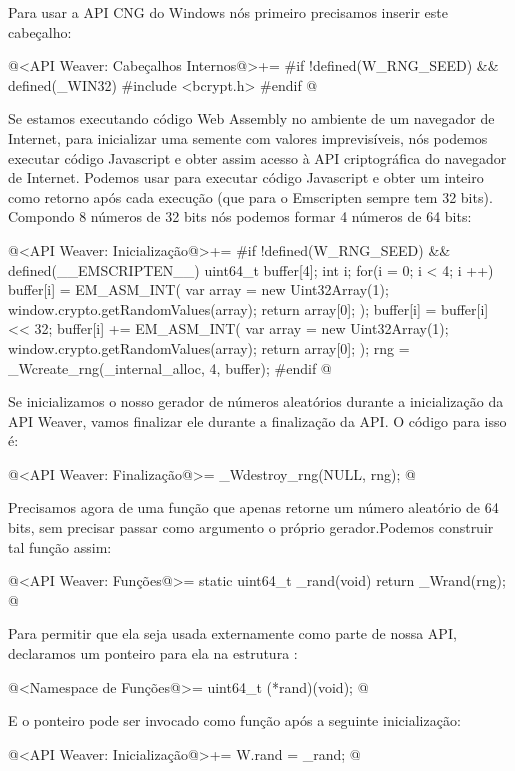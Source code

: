 Para usar a API CNG do Windows nós primeiro precisamos inserir este
cabeçalho:

\iniciocodigo
@<API Weaver: Cabeçalhos Internos@>+=
#if !defined(W_RNG_SEED) && defined(_WIN32)
#include <bcrypt.h>
#endif
@
\fimcodigo

Se estamos executando código Web Assembly no ambiente de um navegador
de Internet, para inicializar uma semente com valores imprevisíveis,
nós podemos executar código Javascript e obter assim acesso à API
criptográfica do navegador de Internet. Podemos
usar  para executar código Javascript e obter
um inteiro como retorno após cada execução (que para o Emscripten
sempre tem 32 bits). Compondo 8 números de 32 bits nós podemos formar
4 números de 64 bits:

\iniciocodigo
@<API Weaver: Inicialização@>+=
#if !defined(W_RNG_SEED) && defined(__EMSCRIPTEN__)
{
  uint64_t buffer[4];
  int i;
  for(i = 0; i < 4; i ++){
    buffer[i] = EM_ASM_INT({
      var array = new Uint32Array(1);
      window.crypto.getRandomValues(array);
      return array[0];
    });
    buffer[i] = buffer[i] << 32;
    buffer[i] += EM_ASM_INT({
      var array = new Uint32Array(1);
      window.crypto.getRandomValues(array);
      return array[0];
    });
  }
  rng = _Wcreate_rng(_internal_alloc, 4, buffer);
}
#endif
@
\fimcodigo

Se inicializamos o nosso gerador de números aleatórios durante a
inicialização da API Weaver, vamos finalizar ele durante a finalização
da API. O código para isso é:

\iniciocodigo
@<API Weaver: Finalização@>=
_Wdestroy_rng(NULL, rng);
@
\fimcodigo

Precisamos agora de uma função que apenas retorne um número aleatório
de 64 bits, sem precisar passar como argumento o próprio
gerador.Podemos construir tal função assim:

\iniciocodigo
@<API Weaver: Funções@>=
static uint64_t _rand(void){
  return _Wrand(rng);
}
@
\fimcodigo

Para permitir que ela seja usada externamente como parte de nossa API,
declaramos um ponteiro para ela na estrutura :

\iniciocodigo
@<Namespace de Funções@>=
uint64_t (*rand)(void);
@
\fimcodigo

E o ponteiro pode ser invocado como função após a seguinte
inicialização:

\iniciocodigo
@<API Weaver: Inicialização@>+=
W.rand = _rand;
@
\fimcodigo

